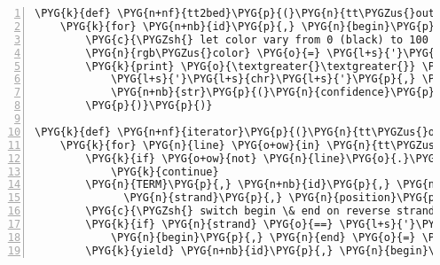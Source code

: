 \begin{Verbatim}[commandchars=\\\{\},numbers=left,firstnumber=1,stepnumber=5]
\PYG{k}{def} \PYG{n+nf}{tt2bed}\PYG{p}{(}\PYG{n}{tt\PYGZus{}output}\PYG{p}{,} \PYG{n}{bed\PYGZus{}file}\PYG{p}{)}\PYG{p}{:}
    \PYG{k}{for} \PYG{n+nb}{id}\PYG{p}{,} \PYG{n}{begin}\PYG{p}{,} \PYG{n}{end}\PYG{p}{,} \PYG{n}{strand}\PYG{p}{,} \PYG{n}{confidence} \PYG{o+ow}{in} \PYG{n}{iterator}\PYG{p}{(}\PYG{n}{tt\PYGZus{}output}\PYG{p}{)}\PYG{p}{:}
        \PYG{c}{\PYGZsh{} let color vary from 0 (black) to 100 (gray)}
        \PYG{n}{rgb\PYGZus{}color} \PYG{o}{=} \PYG{l+s}{'}\PYG{l+s}{,}\PYG{l+s}{'}\PYG{o}{.}\PYG{n}{join}\PYG{p}{(}\PYG{p}{(}\PYG{n+nb}{str}\PYG{p}{(}\PYG{l+m+mi}{100} \PYG{o}{-} \PYG{n+nb}{int}\PYG{p}{(}\PYG{n}{confidence}\PYG{p}{)}\PYG{p}{)}\PYG{p}{,}\PYG{p}{)}\PYG{o}{*}\PYG{l+m+mi}{3}\PYG{p}{)}
        \PYG{k}{print} \PYG{o}{\textgreater{}\textgreater{}} \PYG{n}{bed\PYGZus{}file}\PYG{p}{,} \PYG{l+s}{'}\PYG{l+s+se}{\PYGZbs{}t}\PYG{l+s}{'}\PYG{o}{.}\PYG{n}{join}\PYG{p}{(}\PYG{p}{(}
            \PYG{l+s}{'}\PYG{l+s}{chr}\PYG{l+s}{'}\PYG{p}{,} \PYG{n}{begin}\PYG{p}{,} \PYG{n}{end}\PYG{p}{,} \PYG{l+s}{'}\PYG{l+s}{TERM\PYGZus{}}\PYG{l+s}{'} \PYG{o}{+} \PYG{n+nb}{id}\PYG{p}{,}
            \PYG{n+nb}{str}\PYG{p}{(}\PYG{n}{confidence}\PYG{p}{)}\PYG{p}{,} \PYG{n}{strand}\PYG{p}{,} \PYG{n}{begin}\PYG{p}{,} \PYG{n}{end}\PYG{p}{,} \PYG{n}{rgb\PYGZus{}color}
        \PYG{p}{)}\PYG{p}{)}

\PYG{k}{def} \PYG{n+nf}{iterator}\PYG{p}{(}\PYG{n}{tt\PYGZus{}output}\PYG{p}{)}\PYG{p}{:}
    \PYG{k}{for} \PYG{n}{line} \PYG{o+ow}{in} \PYG{n}{tt\PYGZus{}output}\PYG{p}{:}
        \PYG{k}{if} \PYG{o+ow}{not} \PYG{n}{line}\PYG{o}{.}\PYG{n}{startswith}\PYG{p}{(}\PYG{l+s}{"}\PYG{l+s}{  TERM}\PYG{l+s}{"}\PYG{p}{)}\PYG{p}{:}
            \PYG{k}{continue}
        \PYG{n}{TERM}\PYG{p}{,} \PYG{n+nb}{id}\PYG{p}{,} \PYG{n}{begin}\PYG{p}{,} \PYG{n}{dash}\PYG{p}{,} \PYG{n}{end}\PYG{p}{,} \PYGZbs{}
              \PYG{n}{strand}\PYG{p}{,} \PYG{n}{position}\PYG{p}{,} \PYG{n}{confidence}\PYG{p}{,} \PYG{n}{rest} \PYG{o}{=} \PYG{n}{line}\PYG{o}{.}\PYG{n}{split}\PYG{p}{(}\PYG{n+nb+bp}{None}\PYG{p}{,} \PYG{l+m+mi}{8}\PYG{p}{)}
        \PYG{c}{\PYGZsh{} switch begin \& end on reverse strand}
        \PYG{k}{if} \PYG{n}{strand} \PYG{o}{==} \PYG{l+s}{'}\PYG{l+s}{-}\PYG{l+s}{'}\PYG{p}{:}
            \PYG{n}{begin}\PYG{p}{,} \PYG{n}{end} \PYG{o}{=} \PYG{n}{end}\PYG{p}{,} \PYG{n}{begin}
        \PYG{k}{yield} \PYG{n+nb}{id}\PYG{p}{,} \PYG{n}{begin}\PYG{p}{,} \PYG{n}{end}\PYG{p}{,} \PYG{n}{strand}\PYG{p}{,} \PYG{n+nb}{int}\PYG{p}{(}\PYG{n}{confidence}\PYG{p}{)}
\end{Verbatim}


